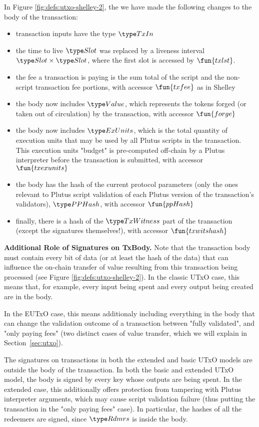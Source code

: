In Figure \ref{fig:defs:utxo-shelley-2}, the we have made the following changes to
the body of the transaction:

\begin{itemize}
  \item transaction inputs have the type $\TxIn$
  \item the
  time to live $\Slot$ was replaced by a liveness interval $\Slot \times \Slot$,
  where the first slot is accessed by $\fun{txlst}$.
  \item the fee a transaction is paying is the sum total of the script and the
  non-script transaction fee portions, with accessor $\fun{txfee}$ as in Shelley
  \item the body now includes $\Value$, which represents
  the tokens forged (or taken out of circulation) by the transaction,
  with accessor $\fun{forge}$
  \item the body now includes $\ExUnits$, which is the total quantity of execution units
  that may be used by all Plutus scripts in the transaction.
  This execution units "budget" is pre-computed off-chain by a Plutus interpreter
  before the transaction is submitted, with accessor $\fun{txexunits}$
  \item the body has the hash of the current protocol parameters
  (only the ones relevant to Plutus script validation of each Plutus
  version of the transaction's validators), $\PPHash$, with accessor $\fun{ppHash}$
  \item finally, there is a hash of the $\TxWitness$
  part of the transaction (except the signatures themselves!),
  with accessor $\fun{txwitshash}$
\end{itemize}

\textbf{Additional Role of Signatures on TxBody.}
Note that the transaction body must contain every bit of data
(or at least the hash of the data) that can influence the
on-chain transfer of value resulting from this transaction being processed
(see Figure \ref{fig:defs:utxo-shelley-2}).
In the classic UTxO case, this means that, for example,
every input being spent and every output being created are in the body.

In the EUTxO case, this means additionaly including everything in the body that can change
the validation outcome of a transaction between "fully validated", and "only
paying fees" (two distinct cases of value transfer, which
we will explain in Section~\ref{sec:utxo}).

The signatures on transactions in both the extended and basic UTxO models
are outside the body of the transaction.
In both the basic and extended UTxO model, the body is signed by every key
whose outputs are being spent. In the extended case, this additionally offers
protection from tampering with Plutus interpreter arguments, which may cause
script validation failure (thus putting the transaction in the "only paying fees" case).
In particular, the hashes of all the redeemers are signed, since $\Rdmrs$ is inside
  the body.

